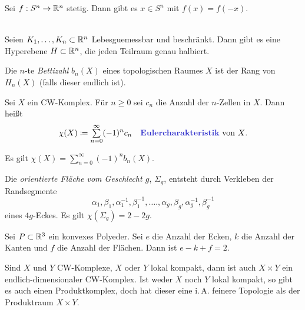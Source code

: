 \documentclass{cheat-sheet}
\begin{document}
\begin{satz}
  Sei $f : S^n \to \mathbb{R}^n$ stetig. Dann gibt es $x \in S^n$ mit $f(x) = f(-x)$.
\end{satz}

\begin{satz}\mbox{}\\
  Seien $K_1, \ldots, K_n \subset \mathbb{R}^n$ Lebesguemessbar und beschränkt. Dann gibt es eine Hyperebene $H \subset \mathbb{R}^n$, die jeden Teilraum genau halbiert.
\end{satz}


\begin{defn}
  Die $n$-te \emph{Bettizahl} $b_n(X)$ eines topologischen Raumes $X$ ist der Rang von $H_n(X)$ (falls dieser endlich ist).
\end{defn}

\begin{defn}
  Sei $X$ ein CW-Komplex. Für $n \geq 0$ sei $c_n$ die Anzahl der $n$-Zellen in $X$. Dann heißt
  \[
    \chi(X) \coloneqq \sum_{n=0}^\infty (-1)^n c_n
    \quad \text{\emph{Eulercharakteristik} von $X$.}
  \]
\end{defn}

\begin{satz}
  Es gilt $\chi(X) = \sum_{n=0}^\infty (-1)^n b_n(X)$.
\end{satz}

\begin{bsp}
  Die \emph{orientierte Fläche vom Geschlecht $g$}, $\Sigma_g$, entsteht durch Verkleben der Randsegmente
  \[ \alpha_1, \beta_1, \alpha_1^{-1}, \beta_1^{-1}, \ldots., \alpha_g, \beta_g, \alpha_g^{-1}, \beta_g^{-1} \]
  eines $4g$-Eckes. Es gilt $\chi(\Sigma_g) = 2 - 2g$.
\end{bsp}

\begin{kor}
  Sei $P \subset \mathbb{R}^3$ ein konvexes Polyeder. Sei $e$ die Anzahl der Ecken, $k$ die Anzahl der Kanten und $f$ die Anzahl der Flächen. Dann ist $e - k + f = 2$.
\end{kor}


\begin{bem}
  Sind $X$ und $Y$ CW-Komplexe, $X$ oder $Y$ lokal kompakt, dann ist auch $X \times Y$ ein endlich-dimensionaler CW-Komplex. Ist weder $X$ noch $Y$ lokal kompakt, so gibt es auch einen Produktkomplex, doch hat dieser eine i.\,A. feinere Topologie als der Produktraum $X \times Y$.
\end{bem}
\end{document}
